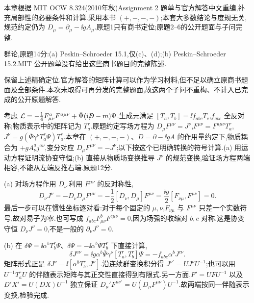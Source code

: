 本章根据 MIT OCW 8.324(2010年秋)Assignment 2 题单与官方解答中文重编,补充局部性的必要条件和计算.采用本书 $(+,-,-,-)$;本套大多数结论与度规无关,规范约定仍为 $D_\mu=\partial_\mu-\ii gA_\mu$.原题1只有商书定位;原题2--6的公开题面与子问完整.

\begin{exercise}
群论,原题14分:(a) Peskin--Schroeder 15.1,仅(c)、(d);(b) Peskin--Schroeder 15.2.MIT 公开题单没有给出这些商书题目的完整陈述.
\end{exercise}
\begin{solution}
保留上述精确定位.官方解答的矩阵计算可以作为学习材料,但不足以确立原商书题面及全部条件.本次未取得可再分发的完整题面,故这两个子问不重构、不计入已完成的公开原题解答.
\end{solution}

\begin{exercise}
考虑 $\mathcal L=-\frac14F_{\mu\nu}^aF^{a\mu\nu}+\bar\Psi(\mathrm i\mathord{\not\mathrel{D}}-m)\Psi$.生成元满足 $[T_a,T_b]=\ii f_{abc}T_c$,$f_{abc}$ 全反对称;物质表示中的矩阵记为 $T_a^r$.原题约定写场方程为 $D_\mu F^{\mu\nu}=J^\nu$,$F^{\mu\nu}=F^{a\mu\nu}T_a^r$,$J^\nu=g(\bar\Psi\gamma^\nu T_a^r\Psi)T_a^r$.本章在 $(+,-,-,-)$、$D=\partial-\ii gA$ 的作用量约定下,物质耦合为 $+gA_\nu^aj^{a\nu}$,变分对应 $D_\mu F^{\mu\nu}=-J^\nu$;以下按这个已明确转换的符号计算.(a) 用运动方程证明流协变守恒;(b) 直接从物质场变换推导 $J^\nu$ 的规范变换,验证场方程两端相容,不能从左端反推右端.原题12分.
\end{exercise}
\begin{solution}
(a) 对场方程作用 $D_\nu$.利用 $F^{\mu\nu}$ 的反对称性,
\[
D_\nu J^\nu=-D_\nu D_\mu F^{\mu\nu}
=-\frac12[D_\nu,D_\mu]F^{\mu\nu}
=\frac{\ii g}{2}[F_{\nu\mu},F^{\mu\nu}]=0.
\]
最后一步可以在惯性坐标逐对看:对于每个固定的 $\mu,\nu$,$F_{\nu\mu}$ 与 $F^{\mu\nu}$ 只差一个实数符号,故对易子为零.也可写成 $f_{abc}F_{\mu\nu}^bF^{c\mu\nu}=0$,因为场强的收缩对 $b,c$ 对称.这是协变守恒 $D_\nu J^\nu=0$,不是一般的 $\partial_\nu J^\nu=0$.

(b) 在 $\delta\Psi=\ii\alpha^bT_b^r\Psi$、$\delta\bar\Psi=-\ii\alpha^b\bar\Psi T_b^r$ 下直接计算,
\[
\delta J^{a\nu}=\ii g\alpha^b\bar\Psi\gamma^\nu[T_a^r,T_b^r]\Psi
=-f_{abc}\alpha^bJ^{c\nu}.
\]
矩阵形式正是 $\delta J^\nu=\ii[\alpha^bT_b^r,J^\nu]$.沿连续群变换积分得 $J^{\nu\prime}=UJ^\nu U^{-1}$;也可以用 $U^{-1}T_a^rU$ 的伴随表示矩阵与其正交性直接得到有限式.另一方面,$F'=UFU^{-1}$ 以及 $D'X'=U(DX)U^{-1}$ 独立保证 $D_\mu'F^{\mu\nu\prime}=U(D_\mu F^{\mu\nu})U^{-1}$.故两端按同一伴随表示变换,检验完成.
\end{solution}

